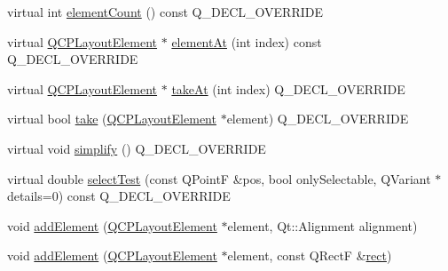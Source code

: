 \begin{DoxyCompactItemize}
\item 
virtual int \hyperlink{classQCPLayoutInset_a7f5aa4d48a2e844cfe6dd7ed8f0861df}{element\+Count} () const Q\+\_\+\+D\+E\+C\+L\+\_\+\+O\+V\+E\+R\+R\+I\+DE
\item 
virtual \hyperlink{classQCPLayoutElement}{Q\+C\+P\+Layout\+Element} $\ast$ \hyperlink{classQCPLayoutInset_a881ca205605bae9c034733b808f93a02}{element\+At} (int index) const Q\+\_\+\+D\+E\+C\+L\+\_\+\+O\+V\+E\+R\+R\+I\+DE
\item 
virtual \hyperlink{classQCPLayoutElement}{Q\+C\+P\+Layout\+Element} $\ast$ \hyperlink{classQCPLayoutInset_abf2e8233f5b7051220907e62ded490a2}{take\+At} (int index) Q\+\_\+\+D\+E\+C\+L\+\_\+\+O\+V\+E\+R\+R\+I\+DE
\item 
virtual bool \hyperlink{classQCPLayoutInset_af7f13cc369f8190b5e7e17d5f39dfe1c}{take} (\hyperlink{classQCPLayoutElement}{Q\+C\+P\+Layout\+Element} $\ast$element) Q\+\_\+\+D\+E\+C\+L\+\_\+\+O\+V\+E\+R\+R\+I\+DE
\item 
virtual void \hyperlink{classQCPLayoutInset_a18b7d508f0baa60cc5dcb1343cf7f32a}{simplify} () Q\+\_\+\+D\+E\+C\+L\+\_\+\+O\+V\+E\+R\+R\+I\+DE
\item 
virtual double \hyperlink{classQCPLayoutInset_a2eeef7ea1b8340e7c7c2e2fc229df5ea}{select\+Test} (const Q\+PointF \&pos, bool only\+Selectable, Q\+Variant $\ast$details=0) const Q\+\_\+\+D\+E\+C\+L\+\_\+\+O\+V\+E\+R\+R\+I\+DE
\item 
void \hyperlink{classQCPLayoutInset_ad61529eb576af7f04dff94abb10c745a}{add\+Element} (\hyperlink{classQCPLayoutElement}{Q\+C\+P\+Layout\+Element} $\ast$element, Qt\+::\+Alignment alignment)
\item 
void \hyperlink{classQCPLayoutInset_a8ff61fbee4a1f0ff45c398009d9f1e56}{add\+Element} (\hyperlink{classQCPLayoutElement}{Q\+C\+P\+Layout\+Element} $\ast$element, const Q\+RectF \&\hyperlink{classQCPLayoutElement_affdfea003469aac3d0fac5f4e06171bc}{rect})
\end{DoxyCompactItemize}
